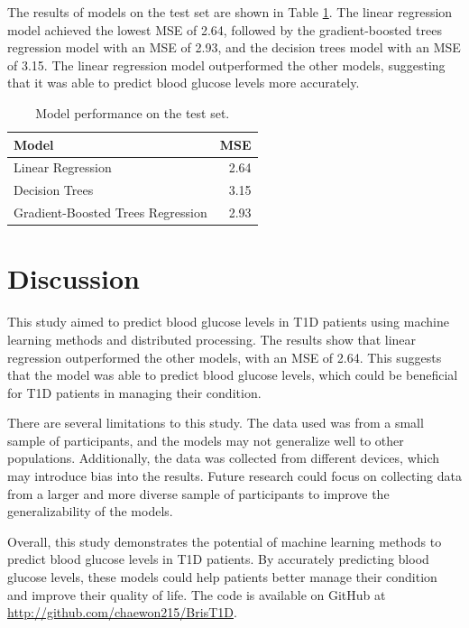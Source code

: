 \documentclass[
	a4paper, %
	10pt, %
	unnumberedsections, %
	twoside, %
]{LTJournalArticle}
\begin{document}
The results of models on the test set are shown in Table \ref{tab:distcounts}. The linear regression model achieved the lowest MSE of 2.64, followed by the gradient-boosted trees regression model with an MSE of 2.93, and the decision trees model with an MSE of 3.15. The linear regression model outperformed the other models, suggesting that it was able to predict blood glucose levels more accurately.

\begin{table}[h!]
	\caption{Model performance on the test set.}
	\centering
	\begin{tabular}{l r}
		\toprule
		Model & MSE \\
		\midrule
		Linear Regression & 2.64 \\
		Decision Trees & 3.15 \\
		Gradient-Boosted Trees Regression & 2.93 \\
		\bottomrule
	\end{tabular}
	\label{tab:distcounts}
\end{table}


\section{Discussion}

This study aimed to predict blood glucose levels in T1D patients using machine learning methods and distributed processing. The results show that linear regression outperformed the other models, with an MSE of 2.64. This suggests that the model was able to predict blood glucose levels, which could be beneficial for T1D patients in managing their condition.

There are several limitations to this study. The data used was from a small sample of participants, and the models may not generalize well to other populations. Additionally, the data was collected from different devices, which may introduce bias into the results. Future research could focus on collecting data from a larger and more diverse sample of participants to improve the generalizability of the models.

Overall, this study demonstrates the potential of machine learning methods to predict blood glucose levels in T1D patients. By accurately predicting blood glucose levels, these models could help patients better manage their condition and improve their quality of life. The code is available on GitHub at \href{http://github.com/chaewon215/BrisT1D}{http://github.com/chaewon215/BrisT1D}.


\end{document}
